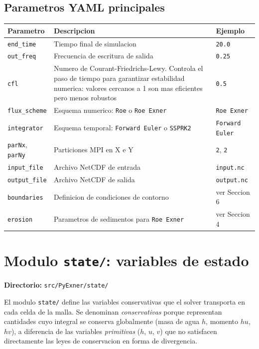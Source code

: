 \documentclass[11pt,a4paper]{article}
\newcommand{\code}[1]{\texttt{#1}}
\begin{document}
\subsection{Parametros YAML principales}

\begin{longtable}{L{3.2cm}L{8.2cm}L{3cm}}
\toprule
Parametro & Descripcion & Ejemplo \\
\midrule
\endhead
\code{end\_time} & Tiempo final de simulacion & \code{20.0} \\
\code{out\_freq} & Frecuencia de escritura de salida & \code{0.25} \\
\code{cfl} & Numero de Courant-Friedrichs-Lewy. Controla el paso de tiempo para garantizar estabilidad numerica: valores cercanos a 1 son mas eficientes pero menos robustos & \code{0.5} \\
\code{flux\_scheme} & Esquema numerico: \code{Roe} o \code{Roe Exner} & \code{Roe Exner} \\
\code{integrator} & Esquema temporal: \code{Forward Euler} o \code{SSPRK2} & \code{Forward Euler} \\
\code{parNx}, \code{parNy} & Particiones MPI en X e Y & \code{2}, \code{2} \\
\code{input\_file} & Archivo NetCDF de entrada & \code{input.nc} \\
\code{output\_file} & Archivo NetCDF de salida & \code{output.nc} \\
\code{boundaries} & Definicion de condiciones de contorno & ver Seccion 6 \\
\code{erosion} & Parametros de sedimentos para \code{Roe Exner} & ver Seccion 4 \\
\bottomrule
\end{longtable}

\section{Modulo \code{state/}: variables de estado}

\textbf{Directorio:} \code{src/PyExner/state/}

El modulo \code{state/} define las variables conservativas que el solver transporta en cada celda
de la malla. Se denominan \emph{conservativas} porque representan cantidades cuyo integral se
conserva globalmente (masa de agua $h$, momento $hu$, $hv$), a diferencia de las variables
\emph{primitivas} ($h$, $u$, $v$) que no satisfacen directamente las leyes de conservacion
en forma de divergencia.
\end{document}
